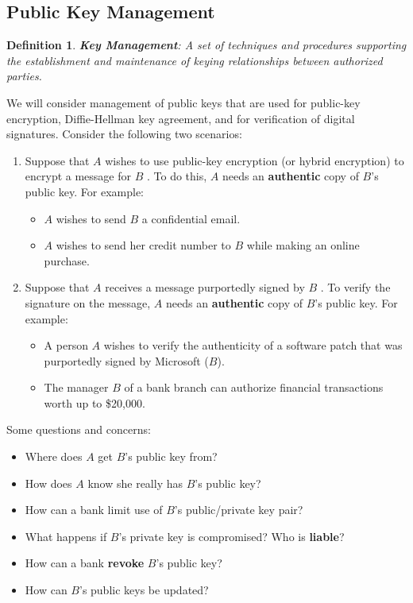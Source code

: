 \documentclass[12pt,titlepage]{article}
\newtheorem{protodefinition}[prototheorem]{Definition}
\newenvironment{definition}
{\colorlet{shadecolor}{cyan!15}\begin{shaded}\begin{protodefinition}\normalfont}{\end{protodefinition}\end{shaded}}
\begin{document}
\subsection{Public Key Management}
\begin{definition}
	\textbf{Key Management}: A set of techniques and procedures supporting the establishment and maintenance of keying relationships between authorized parties.
\end{definition}
We will consider management of public keys that are used for public-key encryption, Diffie-Hellman key agreement, and for verification of digital signatures. Consider the following two scenarios: \begin{enumerate}
	\item Suppose that $A$ wishes to use public-key encryption (or hybrid encryption) to encrypt a message for $B$ . To do this, $A$ needs an \textbf{authentic} copy of $B$'s public key. For example: \begin{itemize}
		\item $A$ wishes to send $B$ a confidential email.
		\item $A$ wishes to send her credit number to $B$ while making an online purchase.
	\end{itemize}
	\item Suppose that $A$ receives a message purportedly signed by $B$ . To verify the signature on the message, $A$ needs an \textbf{authentic} copy of $B$'s public key. For example: \begin{itemize}
		\item A person $A$ wishes to verify the authenticity of a software patch that was purportedly signed by Microsoft ($B$).
		\item The manager $B$ of a bank branch can authorize financial transactions worth up to \$20,000.
	\end{itemize}
\end{enumerate}
Some questions and concerns:\begin{itemize}
	\item Where does $A$ get $B$'s public key from?
	\item How does $A$ know she really has $B$’s public key?
	\item How can a bank limit use of $B$’s public/private key pair?
	\item What happens if $B$'s private key is compromised? Who is \textbf{liable}?
	\item How can a bank \textbf{revoke} $B$'s public key?
	\item How can $B$'s public keys be updated?
\end{itemize}
\end{document}
